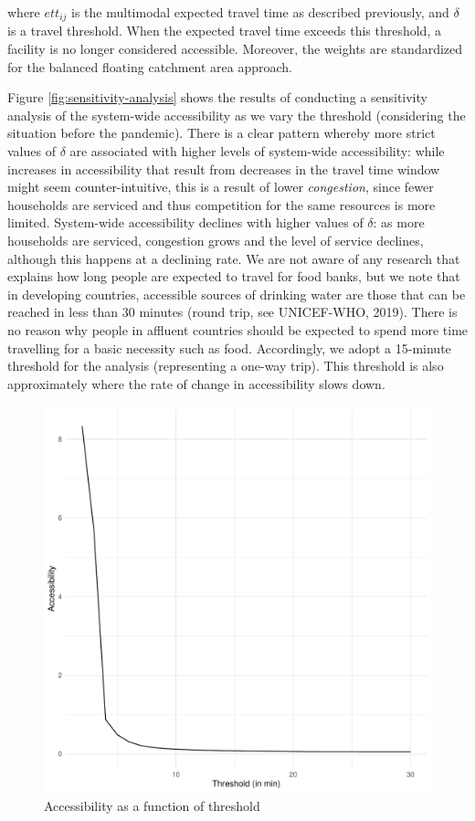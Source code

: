 \documentclass[]{elsarticle} %
\begin{document}
\noindent where \(ett_{ij}\) is the multimodal expected travel time as
described previously, and \(\delta\) is a travel threshold. When the
expected travel time exceeds this threshold, a facility is no longer
considered accessible. Moreover, the weights are standardized for the
balanced floating catchment area approach.

Figure \ref{fig:sensitivity-analysis} shows the results of conducting a
sensitivity analysis of the system-wide accessibility as we vary the
threshold (considering the situation before the pandemic). There is a
clear pattern whereby more strict values of \(\delta\) are associated
with higher levels of system-wide accessibility: while increases in
accessibility that result from decreases in the travel time window might
seem counter-intuitive, this is a result of lower \emph{congestion},
since fewer households are serviced and thus competition for the same
resources is more limited. System-wide accessibility declines with
higher values of \(\delta\): as more households are serviced, congestion
grows and the level of service declines, although this happens at a
declining rate. We are not aware of any research that explains how long
people are expected to travel for food banks, but we note that in
developing countries, accessible sources of drinking water are those
that can be reached in less than 30 minutes (round trip, see UNICEF-WHO,
2019). There is no reason why people in affluent countries should be
expected to spend more time travelling for a basic necessity such as
food. Accordingly, we adopt a 15-minute threshold for the analysis
(representing a one-way trip). This threshold is also approximately
where the rate of change in accessibility slows down.

\begin{figure}
\includegraphics[width=0.6\linewidth]{Accessibility-Foodbanks-Hamilton_files/figure-latex/plot-results-sensitivity-analysis-1} \caption{\label{fig:sensitivity-analysis}Accessibility as a function of threshold}\label{fig:plot-results-sensitivity-analysis}
\end{figure}
\end{document}
